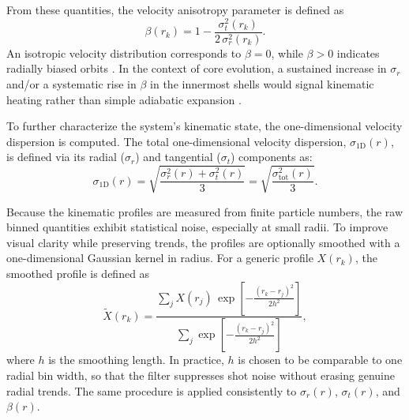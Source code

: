 From these quantities, the velocity anisotropy parameter is defined as
\begin{equation}
\beta(r_k) = 1 - \frac{\sigma_t^2(r_k)}{2\,\sigma_r^2(r_k)}.
\end{equation}
An isotropic velocity distribution corresponds to $\beta = 0$, while $\beta > 0$ indicates radially biased orbits \citep{binney2008galactic}. In the context of core evolution, a sustained increase in $\sigma_r$ and/or a systematic rise in $\beta$ in the innermost shells would signal kinematic heating rather than simple adiabatic expansion \citep{diemand2004relaxation, elzant2006relaxation}.

To further characterize the system's kinematic state, the one-dimensional velocity dispersion is computed. The total one-dimensional velocity dispersion, $\sigma_{\mathrm{1D}}(r)$, is defined via its radial ($\sigma_r$) and tangential ($\sigma_t$) components as:
\begin{equation}
    \sigma_{\mathrm{1D}}(r) = \sqrt{\frac{\sigma_r^2(r) + \sigma_t^2(r)}{3}} = \sqrt{\frac{\sigma_{\mathrm{tot}}^2(r)}{3}}.
    \label{eq:sigma_1d}
\end{equation}

Because the kinematic profiles are measured from finite particle numbers, the raw binned quantities exhibit statistical noise, especially at small radii. To improve visual clarity while preserving trends, the profiles are optionally smoothed with a one-dimensional Gaussian kernel in radius. For a generic profile $X(r_k)$, the smoothed profile is defined as
\begin{equation}
\widetilde{X}(r_k) =
\frac{\displaystyle \sum_j X(r_j)\,
\exp\!\left[-\frac{(r_k-r_j)^2}{2h^2}\right]}
{\displaystyle \sum_j \exp\!\left[-\frac{(r_k-r_j)^2}{2h^2}\right]},
\end{equation}
where $h$ is the smoothing length. In practice, $h$ is chosen to be comparable to one radial bin width, so that the filter suppresses shot noise without erasing genuine radial trends. The same procedure is applied consistently to $\sigma_r(r)$, $\sigma_t(r)$, and $\beta(r)$.


